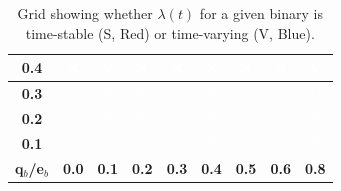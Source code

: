 \documentclass[fleqn,usenatbib]{mnras}
\begin{document}
\begin{table}
\begin{tabular}{|c|c|c|c|c|c|c|c|c|}
    \hline
    \textbf{0.4} & 
    \cellcolor{red}\textcolor{white}{S} & 
    \cellcolor{blue}\textcolor{white}{V} & 
    \cellcolor{red}\textcolor{white}{S} & 
    \cellcolor{red}\textcolor{white}{S} & 
    \cellcolor{red}\textcolor{white}{S} & 
    \cellcolor{red}\textcolor{white}{S} & 
    \cellcolor{red}\textcolor{white}{S} & 
    \cellcolor{blue}\textcolor{white}{V} \\ 
    \hline
    \textbf{0.3} & 
    \cellcolor{red}\textcolor{white}{S} & 
    \cellcolor{blue}\textcolor{white}{V} & 
    \cellcolor{red}\textcolor{white}{S} & 
    \cellcolor{red}\textcolor{white}{S} & 
    \cellcolor{red}\textcolor{white}{S} & 
    \cellcolor{red}\textcolor{white}{S} & 
    \cellcolor{red}\textcolor{white}{S} & 
    \cellcolor{blue}\textcolor{white}{V} \\ 
    \hline
    \textbf{0.2} & 
    \cellcolor{red}\textcolor{white}{S} & 
    \cellcolor{blue}\textcolor{white}{V} & 
    \cellcolor{red}\textcolor{white}{S} & 
    \cellcolor{red}\textcolor{white}{S} & 
    \cellcolor{red}\textcolor{white}{S} & 
    \cellcolor{red}\textcolor{white}{S} & 
    \cellcolor{red}\textcolor{white}{S} & 
    \cellcolor{red}\textcolor{white}{S} \\ 
    \hline
    \textbf{0.1} & 
    \cellcolor{red}\textcolor{white}{S} & 
    \cellcolor{red}\textcolor{white}{S} & 
    \cellcolor{red}\textcolor{white}{S} & 
    \cellcolor{red}\textcolor{white}{S} & 
    \cellcolor{red}\textcolor{white}{S} & 
    \cellcolor{red}\textcolor{white}{S} & 
    \cellcolor{red}\textcolor{white}{S} & 
    \cellcolor{red}\textcolor{white}{S} \\ 
    \hline
    \multicolumn{1}{|c|}{\textbf{q$_b$/e$_b$}} & \textbf{0.0} & \textbf{0.1} & \textbf{0.2} & \textbf{0.3} & \textbf{0.4} & \textbf{0.5} & \textbf{0.6} & \textbf{0.8} \\
    \hline
\end{tabular}
\caption{Grid showing whether $\lambda(t)$ for a given binary is time-stable (S, Red) or time-varying (V, Blue).}
\label{tab:stable_varying_grid}
\end{table}
\end{document}

